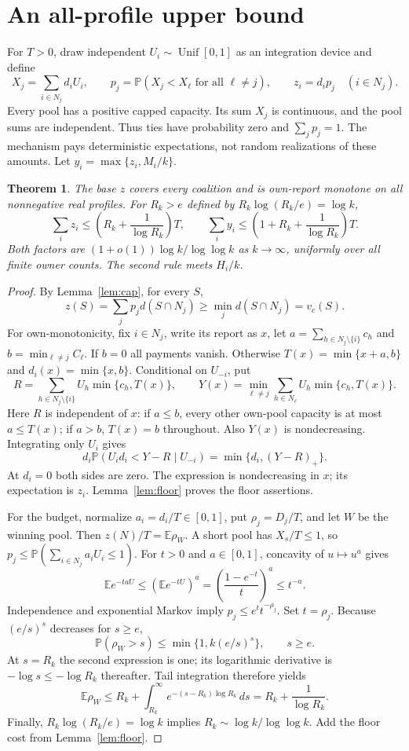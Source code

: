 \documentclass[11pt]{article}
\newtheorem{theorem}{Theorem}[section]
\theoremstyle{definition}\newtheorem{definition}[theorem]{Definition}
\theoremstyle{remark}\newtheorem{remark}[theorem]{Remark}
\newcommand{\E}{\mathbb E}
\newcommand{\Prob}{\mathbb P}
\begin{document}
\section{An all-profile upper bound}\label{sec:banzhaf}
For $T>0$, draw independent $U_i\sim\operatorname{Unif}[0,1]$ as an
integration device and define
\[
 X_j=\sum_{i\in N_j}d_iU_i,\qquad
 p_j=\Prob(X_j<X_\ell\text{ for all }\ell\ne j),\qquad z_i=d_ip_j
 \quad(i\in N_j).
\]
Every pool has a positive capped capacity. Its sum $X_j$ is continuous, and
the pool sums are independent. Thus ties have probability zero and
$\sum_jp_j=1$. The mechanism pays deterministic expectations, not random
realizations of these amounts. Let $y_i=\max\{z_i,M_i/k\}$.

\begin{theorem}\label{thm:upper}
The base $z$ covers every coalition and is own-report monotone on all
nonnegative real profiles. For $R_k>e$ defined by
$R_k\log(R_k/e)=\log k$,
\[
 \sum_i z_i\le\left(R_k+\frac1{\log R_k}\right)T,
 \qquad
 \sum_i y_i\le\left(1+R_k+\frac1{\log R_k}\right)T.
\]
Both factors are $(1+o(1))\log k/\log\log k$ as $k\to\infty$,
uniformly over all finite owner counts. The second rule meets $H_i/k$.
\end{theorem}
\begin{proof}
By Lemma~\ref{lem:cap}, for every $S$,
\[
 z(S)=\sum_jp_jd(S\cap N_j)\ge\min_jd(S\cap N_j)=v_c(S).
\]
For own-monotonicity, fix $i\in N_j$, write its report as $x$, let
$a=\sum_{h\in N_j\setminus\{i\}}c_h$ and
$b=\min_{\ell\ne j}C_\ell$. If $b=0$ all payments vanish. Otherwise
$T(x)=\min\{x+a,b\}$ and $d_i(x)=\min\{x,b\}$. Conditional on $U_{-i}$,
put
\[
 R=\sum_{h\in N_j\setminus\{i\}}U_h\min\{c_h,T(x)\},\qquad
 Y(x)=\min_{\ell\ne j}\sum_{h\in N_\ell}U_h\min\{c_h,T(x)\}.
\]
Here $R$ is independent of $x$: if $a\le b$, every other own-pool capacity
is at most $a\le T(x)$; if $a>b$, $T(x)=b$ throughout. Also $Y(x)$ is
nondecreasing. Integrating only $U_i$ gives
\[
 d_i\Prob(U_id_i<Y-R\mid U_{-i})=\min\{d_i,(Y-R)_+\}.
\]
At $d_i=0$ both sides are zero. The expression is nondecreasing in $x$;
its expectation is $z_i$. Lemma~\ref{lem:floor} proves the floor assertions.

For the budget, normalize $a_i=d_i/T\in[0,1]$, put $\rho_j=D_j/T$, and
let $W$ be the winning pool. Then $z(N)/T=\E\rho_W$. A short pool has
$X_s/T\le1$, so
$p_j\le\Prob(\sum_{i\in N_j}a_iU_i\le1)$.
For $t>0$ and $a\in[0,1]$, concavity of $u\mapsto u^a$ gives
\[
 \E e^{-taU}\le(\E e^{-tU})^a
 =\left(\frac{1-e^{-t}}t\right)^a\le t^{-a}.
\]
Independence and exponential Markov imply
$p_j\le e^t t^{-\rho_j}$. Set $t=\rho_j$. Because $(e/s)^s$ decreases
for $s\ge e$,
\[
 \Prob(\rho_W>s)\le\min\{1,k(e/s)^s\},\qquad s\ge e.
\]
At $s=R_k$ the second expression is one; its logarithmic derivative is
$-\log s\le-\log R_k$ thereafter. Tail integration therefore yields
\[
 \E\rho_W\le R_k+\int_{R_k}^{\infty}
 e^{-(s-R_k)\log R_k}\,ds=R_k+\frac1{\log R_k}.
\]
Finally, $R_k\log(R_k/e)=\log k$ implies
$R_k\sim\log k/\log\log k$. Add the floor cost from
Lemma~\ref{lem:floor}.
\end{proof}
\end{document}
